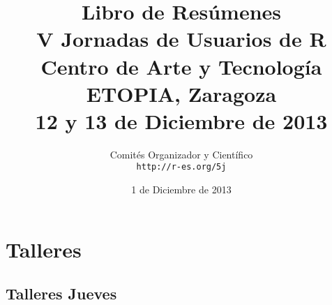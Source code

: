 \documentclass[a4paper, 12pt]{memoir}
\renewcommand{\partname}{Parte}
\begin{document}
\frontmatter

\begin{titlingpage}

  \title{
    \Large{Libro de Resúmenes}\\
    \Huge{V Jornadas de Usuarios de R}\\
    \vspace{15pt}
    \Large{Centro de Arte y Tecnología ETOPIA, Zaragoza}\\
    \large{12 y 13 de Diciembre de 2013}\\
  }

  \author{
    Comités Organizador y Científico\\
    \texttt{http://r-es.org/5j}}

  \date{1 de Diciembre de 2013}

  \maketitle


\end{titlingpage}




\cleardoublepage

\tableofcontents

\cleardoublepage



\mainmatter

\renewcommand{\partname}{Sesión de Comunicaciones}

\part[Sesión de Comunicaciones I]{}
\label{part:comunicacionesI}



\part[Sesión de Comunicaciones II]{}
\label{part:comunicacionesII}





\part{Talleres}
\label{part:talleres}

\chapter{Talleres Jueves}
\end{document}
